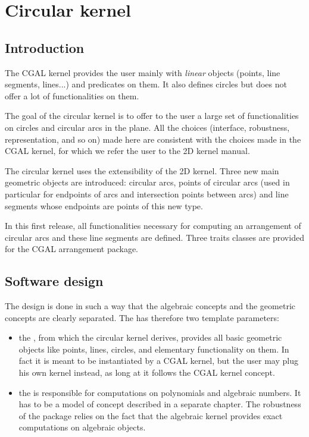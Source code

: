 \chapter{Circular kernel}
\label{chapter-circular-kernel}


\section{Introduction}

The CGAL kernel provides the user mainly with \textit{linear} objects
(points, line segments, lines...) and predicates on them. It also
defines circles but does not offer a lot of functionalities on them. 

The goal of the circular kernel is to offer to the user a large set of
functionalities on circles and circular arcs in the plane. All the
choices (interface, robustness, representation, and so on) made here
are consistent with the choices made in the CGAL kernel, for which we
refer the user to the 2D kernel manual. 

The circular kernel uses the extensibility of the 2D kernel. 
Three new main geometric objects are introduced: circular arcs, points
of circular arcs (used in particular for endpoints of arcs and
intersection points between arcs) and line segments whose endpoints
are points of this new type.

In this first release, all functionalities necessary for computing an
arrangement of circular arcs and these line segments are
defined. Three traits classes are provided for the CGAL arrangement
package. 

\section{Software design}

The design is done in such a way that the algebraic concepts and the
geometric concepts are clearly separated. The 
has therefore two template parameters: 
\begin{itemize}
\item {} the , from which the circular kernel derives,
provides all basic geometric objects like points, lines, circles, and
elementary functionality on them. In fact it is meant to be
instantiated by a CGAL kernel,  but the user may plug his own kernel
instead, as long at it follows the CGAL kernel concept. 
\item {} the  is responsible for computations on
polynomials and algebraic numbers. It has to be a model of concept 
 described in a separate chapter. The
robustness of the package relies on the fact that the algebraic kernel
provides exact computations on algebraic objects.
\end{itemize}

